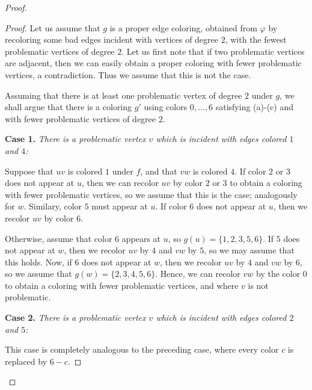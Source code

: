 \documentclass[12pt]{article}
\theoremstyle{plain}
\theoremstyle{definition}
\numberwithin{equation}{section}
\begin{document}
\begin{proof}

\begin{proof}	
	Let us assume that $g$ is a proper edge coloring, obtained from $\varphi$ 
	by recoloring some bad edges incident with vertices of degree $2$,
	with the fewest problematic vertices of degree $2$.
	Let us first note that if two problematic vertices are adjacent, then we can easily obtain a proper coloring
	with fewer problematic vertices, a contradiction. Thus we assume that this is not the case.

	Assuming that there is at least one problematic vertex of degree $2$ under $g$,
	we shall argue that there is a coloring $g'$ using colors $0, \dots, 6$ satisfying (a)-(c) and with
	fewer problematic vertices of degree $2$.

\bigskip

	{\bf Case 1.} {\em There is a problematic vertex $v$ which is incident with edges colored $1$ and $4$:}

	Suppose that $uv$ is colored $1$ under $f$, and that $vw$ is colored $4$. If color $2$ or $3$ does
	not appear at $u$, then we can recolor $uv$ by color $2$ or $3$ to obtain a coloring with fewer
	problematic vertices, so we assume that this is the case; analogously for $w$. Similary, color $5$
	must appear at $u$. If color $6$ does not appear at $u$, then we recolor $uv$ by color $6$.

	Otherwise, assume that color $6$ appears at $u$, so $g(u)=\{1,2,3,5,6\}$. If $5$ does not appear
	at $w$, then we recolor $uv$ by $4$ and $vw$ by $5$, so we may assume that this holds. Now, if
	$6$ does not appear at $w$, then we recolor $uv$ by $4$ and $vw$ by $6$, so we assume that
	$g(w) = \{2,3,4,5,6\}$. Hence, we can recolor $vw$ by the color $0$ to obtain a coloring
	with fewer problematic vertices, and where $v$ is not problematic.

	\bigskip

	{\bf Case 2.}	 {\em There is a problematic vertex $v$ which is incident with edges colored $2$ and $5$:}
	
	This case is completely analogous to the preceding case, where every color $c$ is replaced by $6-c$.


\end{proof}
\end{proof}
\end{document}
